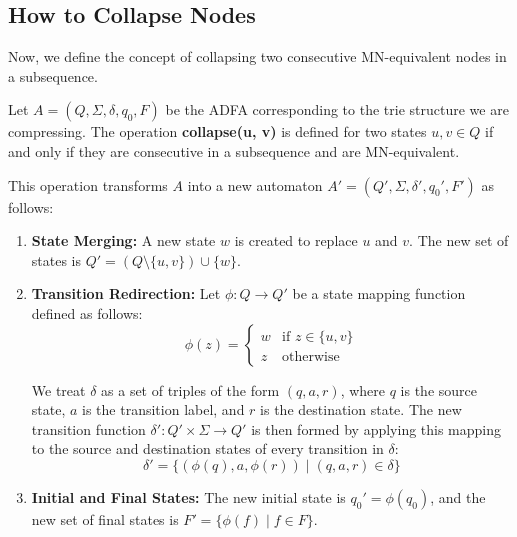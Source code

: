 \subsection{How to Collapse Nodes}
Now, we define the concept of collapsing two consecutive MN-equivalent nodes in a subsequence.
\begin{definition}
    \label{def:collapsing_pair}
    Let $A = (Q, \Sigma, \delta, q_0, F)$ be the ADFA corresponding to the trie structure we are compressing. The operation \textbf{collapse(u, v)} is defined for two states $u, v \in Q$ if and only if they are consecutive in a subsequence and are MN-equivalent.

    This operation transforms $A$ into a new automaton $A'=(Q', \Sigma, \delta', q_0', F')$ as follows:
    \begin{enumerate}[leftmargin=25pt]
        \item \textbf{State Merging:} A new state $w$ is created to replace $u$ and $v$. The new set of states is $Q' = (Q \setminus \{u, v\}) \cup \{w\}$.
        \item \textbf{Transition Redirection:} Let $\phi: Q \to Q'$ be a state mapping function defined as follows:
        \[
            \phi(z) = 
            \begin{cases} 
                w & \text{if } z \in \{u, v\} \\
                z & \text{otherwise}
            \end{cases}
        \]
        
        We treat $\delta$ as a set of triples of the form $(q, a, r)$, where $q$ is the source state, $a$ is the transition label, and $r$ is the destination state. The new transition function $\delta': Q' \times \Sigma \to Q'$ is then formed by applying this mapping to the source and destination states of every transition in $\delta$:
        \[
            \delta' = \{ (\phi(q), a, \phi(r)) \mid (q, a, r) \in \delta \}
        \]
        \item \textbf{Initial and Final States:} The new initial state is $q_0' = \phi(q_0)$, and the new set of final states is $F' = \{ \phi(f) \mid f \in F \}$.
    \end{enumerate}
\end{definition}

